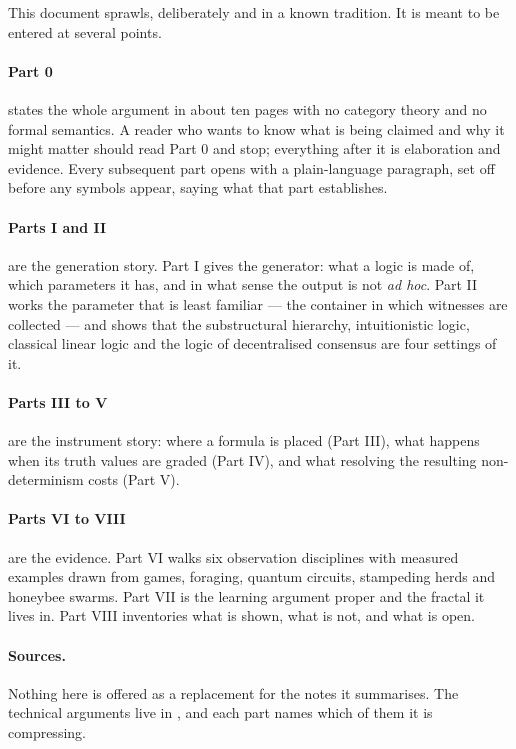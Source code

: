 \documentclass[11pt]{article}
\theoremstyle{definition}
\theoremstyle{plain}
\begin{document}
This document sprawls, deliberately and in a known tradition. It is meant to be
entered at several points.

\paragraph{Part 0} states the whole argument in about ten pages with no category
theory and no formal semantics. A reader who wants to know what is being claimed
and why it might matter should read Part 0 and stop; everything after it is
elaboration and evidence. Every subsequent part opens with a plain-language
paragraph, set off before any symbols appear, saying what that part establishes.

\paragraph{Parts I and II} are the generation story. Part I gives the generator:
what a logic is made of, which parameters it has, and in what sense the output is
not \emph{ad hoc}. Part II works the parameter that is least familiar --- the
container in which witnesses are collected --- and shows that the substructural
hierarchy, intuitionistic logic, classical linear logic and the logic of
decentralised consensus are four settings of it.

\paragraph{Parts III to V} are the instrument story: where a formula is placed
(Part III), what happens when its truth values are graded (Part IV), and what
resolving the resulting non-determinism costs (Part V).

\paragraph{Parts VI to VIII} are the evidence. Part VI walks six observation
disciplines with measured examples drawn from games, foraging, quantum circuits,
stampeding herds and honeybee swarms. Part VII is the learning argument proper
and the fractal it lives in. Part VIII inventories what is shown, what is not,
and what is open.

\paragraph{Sources.} Nothing here is offered as a replacement for the notes it
summarises. The technical arguments live in
\cite{Zeus,GradedWhere,ChoiceFormulae,QuorumNote,ScientistNote,GameNote,ComposeNote,EngineNote,ScopeNote,WeightedGSLT,GsltOmnibus,FuzzyRho,ChoiceScheduling,ConsensusTypes},
and each part names which of them it is compressing.
\end{document}
